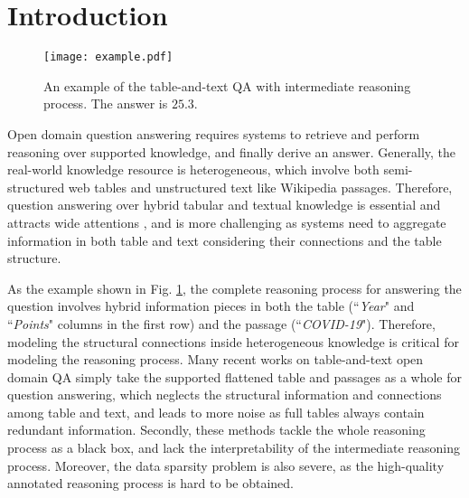 \documentclass[11pt]{article}
\begin{document}
\section{Introduction}
	\begin{figure}[t]
	\vspace{3mm}
		\centering
		\texttt{[image: example.pdf]}
		\caption{An example of the table-and-text QA with intermediate reasoning process. The answer is $25.3$.}
		\label{fig:example}
	\vspace{-3mm}
	\end{figure}
	Open domain question answering \cite{joshi2017triviaqa,dunn2017searchqa,nqopen} requires systems to retrieve and perform reasoning over supported knowledge, and finally derive an answer. 
Generally, the real-world knowledge resource is heterogeneous, which involve both semi-structured web tables and unstructured text like Wikipedia passages.
Therefore, question answering over hybrid tabular and textual knowledge is essential and attracts wide attentions \cite{chen2020open}, and is more challenging as systems need to aggregate information in both table and text considering their connections and the table structure.  
	
	As the example shown in Fig. \ref{fig:example}, the complete reasoning process for answering the question involves hybrid information pieces in both the table (``\textit{Year}" and ``\textit{Points}" columns in the first row) and the passage (``\textit{COVID-19}"). 
	Therefore, modeling the structural connections inside heterogeneous knowledge is critical for modeling the reasoning process. 
	Many recent works on table-and-text open domain QA simply take the supported flattened table and passages \cite{chen2020open,li2021dual} as a whole for question answering, which neglects the structural information and connections among table and text, and leads to more noise as full tables always contain redundant information. 
Secondly, these methods tackle the whole reasoning process as a black box, and lack the interpretability of the intermediate reasoning process. 
	Moreover, the data sparsity problem is also severe, as the high-quality annotated reasoning process is hard to be obtained.
\end{document}
